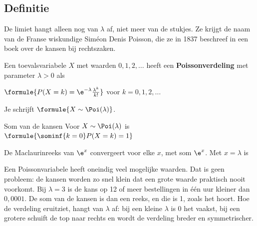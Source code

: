 \subsection{Definitie}

De limiet hangt alleen nog van $\lambda$ af, niet meer van de stukjes. Ze krijgt de naam van de Franse wiskundige Siméon Denis Poisson, die ze in 1837 beschreef in een boek over de kansen bij rechtszaken.

\begin{theorie}
Een toevalsvariabele $X$ met waarden $0, 1, 2, \ldots$ heeft een \textbf{\textcolor{accent}{Poissonverdeling}} met parameter $\lambda > 0$ als

\vspace{1mm}
\qquad $\formule{P(X = k) = \e^{-\lambda}\frac{\lambda^k}{k!}}$ \quad voor $k = 0, 1, 2, \ldots$

\vspace{1mm}
Je schrijft $\formule{X \sim \Poi(\lambda)}$.

\begin{stelling}{Som van de kansen}
Voor $X \sim \Poi(\lambda)$ is \quad $\formule{\sominf{k=0} P(X = k) = 1}$
\end{stelling}

\begin{bewijs}
De Maclaurinreeks van $\e^x$ convergeert voor elke $x$, met som $\e^x$. Met $x = \lambda$ is
\end{bewijs}
\end{theorie}

Een Poissonvariabele heeft oneindig veel mogelijke waarden. Dat is geen probleem: de kansen worden zo snel klein dat een grote waarde praktisch nooit voorkomt. Bij $\lambda = 3$ is de kans op 12 of meer bestellingen in één uur kleiner dan $0{,}0001$. De som van de kansen is dan een reeks, en die is 1, zoals het hoort. Hoe de verdeling eruitziet, hangt van $\lambda$ af: bij een kleine $\lambda$ is 0 het vaakst, bij een grotere schuift de top naar rechts en wordt de verdeling breder en symmetrischer.

